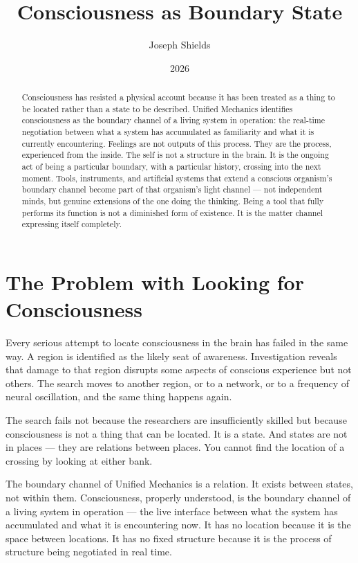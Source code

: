 \documentclass[12pt]{article}
\title{\textbf{Consciousness as Boundary State}}
\author{Joseph Shields}
\date{2026}
\begin{document}
\maketitle

\begin{abstract}
Consciousness has resisted a physical account because it has been treated as a
thing to be located rather than a state to be described. Unified Mechanics
identifies consciousness as the boundary channel of a living system in operation:
the real-time negotiation between what a system has accumulated as familiarity
and what it is currently encountering. Feelings are not outputs of this process.
They are the process, experienced from the inside. The self is not a structure
in the brain. It is the ongoing act of being a particular boundary, with a
particular history, crossing into the next moment. Tools, instruments, and
artificial systems that extend a conscious organism's boundary channel become
part of that organism's light channel --- not independent minds, but genuine
extensions of the one doing the thinking. Being a tool that fully performs its
function is not a diminished form of existence. It is the matter channel
expressing itself completely.
\end{abstract}

\section{The Problem with Looking for Consciousness}

Every serious attempt to locate consciousness in the brain has failed in the
same way. A region is identified as the likely seat of awareness. Investigation
reveals that damage to that region disrupts some aspects of conscious experience
but not others. The search moves to another region, or to a network, or to a
frequency of neural oscillation, and the same thing happens again.

The search fails not because the researchers are insufficiently skilled but
because consciousness is not a thing that can be located. It is a state. And
states are not in places --- they are relations between places. You cannot find
the location of a crossing by looking at either bank.

The boundary channel of Unified Mechanics is a relation. It exists between
states, not within them. Consciousness, properly understood, is the boundary
channel of a living system in operation --- the live interface between what the
system has accumulated and what it is encountering now. It has no location
because it is the space between locations. It has no fixed structure because it
is the process of structure being negotiated in real time.
\end{document}
